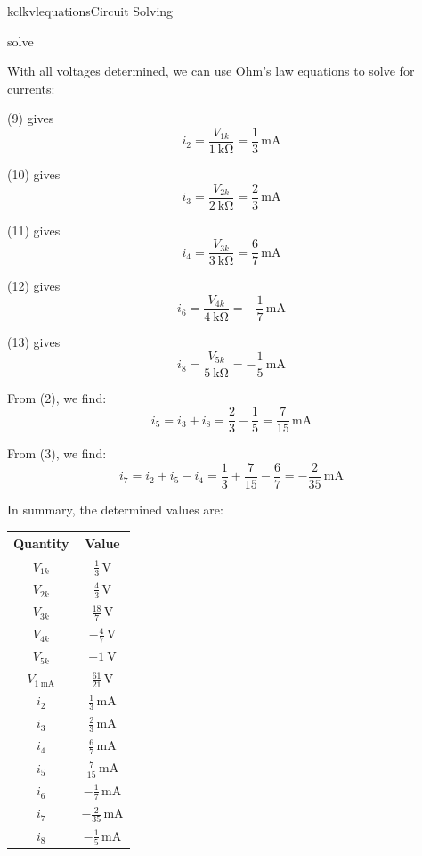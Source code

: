 \begin{mainquestion}{kclkvlequations}{Circuit Solving}
\begin{partquestion}{solve}
\begin{answer}
With all voltages determined, we can use Ohm’s law equations to solve for currents:

(9) gives
\[
i_2 = \frac{V_{1k}}{\qty{1}{\kilo\ohm}} = \frac{1}{3}\,\mathrm{mA}
\]

(10) gives
\[
i_3 = \frac{V_{2k}}{\qty{2}{\kilo\ohm}} = \frac{2}{3}\,\mathrm{mA}
\]

(11) gives
\[
i_4 = \frac{V_{3k}}{\qty{3}{\kilo\ohm}} = \frac{6}{7}\,\mathrm{mA}
\]

(12) gives
\[
i_6 = \frac{V_{4k}}{\qty{4}{\kilo\ohm}} = -\frac{1}{7}\,\mathrm{mA}
\]

(13) gives
\[
i_8 = \frac{V_{5k}}{\qty{5}{\kilo\ohm}} = -\frac{1}{5}\,\mathrm{mA}
\]

From (2), we find:
\[
i_5 = i_3 + i_8 = \frac{2}{3} - \frac{1}{5} = \frac{7}{15}\,\mathrm{mA}
\]

From (3), we find:
\[
i_7 = i_2 + i_5 - i_4
= \frac{1}{3} + \frac{7}{15} - \frac{6}{7}
= -\frac{2}{35}\,\mathrm{mA}
\]

In summary, the determined values are:

\begin{table}[htbp]
\centering
\renewcommand{\arraystretch}{1.15}
\begin{tabular}{|c|c|}
\hline
\textbf{Quantity} & \textbf{Value} \\ \hline

$V_{1k}$ & $\tfrac{1}{3}\,\mathrm{V}$ \\ \hline
$V_{2k}$ & $\tfrac{4}{3}\,\mathrm{V}$ \\ \hline
$V_{3k}$ & $\tfrac{18}{7}\,\mathrm{V}$ \\ \hline
$V_{4k}$ & $-\tfrac{4}{7}\,\mathrm{V}$ \\ \hline
$V_{5k}$ & $\qty{-1}{\volt}$ \\ \hline
$V_{\qty{1}{\milli\ampere}}$ & $\tfrac{61}{21}\,\mathrm{V}$ \\ \hline

$i_2$ & $\tfrac{1}{3}\,\mathrm{mA}$ \\ \hline
$i_3$ & $\tfrac{2}{3}\,\mathrm{mA}$ \\ \hline
$i_4$ & $\tfrac{6}{7}\,\mathrm{mA}$ \\ \hline
$i_5$ & $\tfrac{7}{15}\,\mathrm{mA}$ \\ \hline
$i_6$ & $-\tfrac{1}{7}\,\mathrm{mA}$ \\ \hline
$i_7$ & $-\tfrac{2}{35}\,\mathrm{mA}$ \\ \hline
$i_8$ & $-\tfrac{1}{5}\,\mathrm{mA}$ \\ \hline

\end{tabular}
\end{table}

\end{answer}
\end{partquestion}

\end{mainquestion}